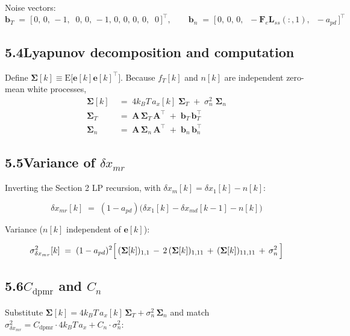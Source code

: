 \documentclass[11pt]{article}
\newcommand{\T}{^{\top}}
\newcommand{\kB}{k_B}
\begin{document}
\noindent Noise vectors:
\[
\bm{b}_T \;=\; \bigl[\,0,\,0,\,{-}1,\;\;0,\,0,\,{-}1,\,0,\,0,\,0,\,0,\;\;0\,\bigr]\T,
\qquad
\bm{b}_n \;=\; \bigl[\,0,\,0,\,0,\;\;{-}\bm{F}_e\bm{L}_{ss}(:,1),\;\;{-}a_{pd}\,\bigr]\T
\]

\subsection*{5.4\quad Lyapunov decomposition and computation}

Define $\bm{\Sigma}[k] \!\equiv\! \mathrm{E}\bigl[\bm{e}[k]\bm{e}[k]\T\bigr]$.
Because $f_T[k]$ and $n[k]$ are independent zero-mean white processes,
\begin{align}
\bm{\Sigma}[k] &\;=\; 4\kB T\,a_x[k]\;\bm{\Sigma}_T \;+\; \sigma^{2}_n\;\bm{\Sigma}_n \\[2pt]
\bm{\Sigma}_T  &\;=\; \bm{A}\,\bm{\Sigma}_T\,\bm{A}\T \;+\; \bm{b}_T\,\bm{b}_T\T \\[2pt]
\bm{\Sigma}_n  &\;=\; \bm{A}\,\bm{\Sigma}_n\,\bm{A}\T \;+\; \bm{b}_n\,\bm{b}_n\T
\end{align}



\subsection*{5.5\quad Variance of $\delta x_{mr}$}

Inverting the Section 2 LP recursion, with $\delta x_m[k] = \delta x_1[k] - n[k]$:

\begin{equation}
\delta x_{mr}[k] \;=\; (1-a_{pd})\bigl(\delta x_1[k] - \delta x_{md}[k\!-\!1] - n[k]\bigr)
\end{equation}

\noindent Variance ($n[k]$ independent of $\bm{e}[k]$):

\begin{equation}
\sigma^{2}_{\delta x_{mr}}[k]
  \;=\; (1-a_{pd})^{2}\Bigl[\,
    (\bm{\Sigma}[k])_{1,1} \,-\, 2\,(\bm{\Sigma}[k])_{1,11} \,+\, (\bm{\Sigma}[k])_{11,11}
    \,+\, \sigma^{2}_n
  \,\Bigr]
\end{equation}

\subsection*{5.6\quad $C_{\mathrm{dpmr}}$ and $C_{n}$}

Substitute $\bm{\Sigma}[k] = 4\kB T\,a_x[k]\,\bm{\Sigma}_T + \sigma^{2}_n\,\bm{\Sigma}_n$ and match
$\sigma^{2}_{\delta x_{mr}} = C_{\mathrm{dpmr}}\!\cdot\! 4\kB T\,a_x + C_{n}\!\cdot\! \sigma^{2}_n$:
\end{document}
